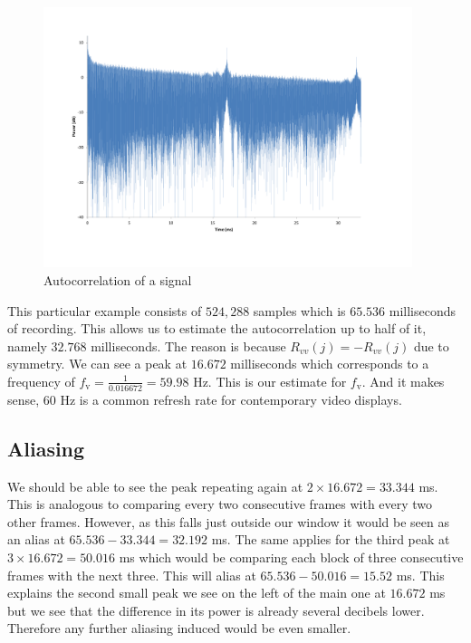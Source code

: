 \documentclass[a4paper,12pt,twoside,openright]{report}
\begin{document}
\begin{figure}[h]
\centering
  \includegraphics[width=0.96\textwidth]{autocorr}
  \caption{Autocorrelation of a signal}
  \label{fig:autocorr}
\end{figure}

This particular example consists of $524,288$ samples which is $65.536$ milliseconds of recording. This allows us to estimate the autocorrelation up to half of it, namely $32.768$ milliseconds. The reason is because $R_{vv}(j)=-R_{vv}(j)$ due to symmetry. We can see a peak at $16.672$ milliseconds which corresponds to a frequency of $f_\text{v} = \frac{1}{0.016672} = 59.98$ Hz. This is our estimate for $f_\text{v}$. And it makes sense, $60$ Hz is a common refresh rate for contemporary video displays.

\subsection{Aliasing}
We should be able to see the peak repeating again at $2 \times 16.672 = 33.344$ ms. This is analogous to comparing every two consecutive frames with every two other frames. However, as this falls just outside our window it would be seen as an alias at $65.536-33.344 = 32.192$ ms. The same applies for the third peak at $3 \times 16.672 = 50.016$ ms which would be comparing each block of three consecutive frames with the next three. This will alias at $65.536 - 50.016 = 15.52$ ms. This explains the second small peak we see on the left of the main one at $16.672$ ms but we see that the difference in its power is already several decibels lower. Therefore any further aliasing induced would be even smaller.
\end{document}
